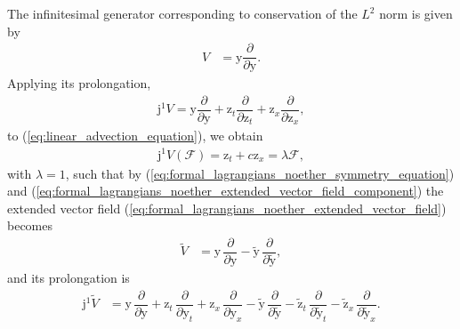 \documentclass[12pt,a4paper,reqno]{article}
\begin{document}
The infinitesimal generator corresponding to conservation of the $L^{2}$ norm is given by
\begin{align}\label{eq:linear_advection_generator_U_L2}
V &= {\ensuremath{{\ensuremath{\mathrm{{y}}}}}} \dfrac{\partial}{\partial {\ensuremath{{\ensuremath{\mathrm{{y}}}}}}} .
\end{align}
Applying its prolongation,
\begin{align}
{\ensuremath{\mathrm{j}}}^{1} V = {\ensuremath{{\ensuremath{\mathrm{{y}}}}}} \dfrac{\partial}{\partial {\ensuremath{{\ensuremath{\mathrm{{y}}}}}}} + {\ensuremath{{\ensuremath{\mathrm{{z}}}}}}_{\ensuremath{{\ensuremath{{t}}}}} \dfrac{\partial}{\partial {\ensuremath{{\ensuremath{\mathrm{{z}}}}}}_{\ensuremath{{\ensuremath{{t}}}}}} + {\ensuremath{{\ensuremath{\mathrm{{z}}}}}}_{\ensuremath{{\ensuremath{{x}}}}} \dfrac{\partial}{\partial {\ensuremath{{\ensuremath{\mathrm{{z}}}}}}_{\ensuremath{{\ensuremath{{x}}}}}} ,
\end{align}
to (\ref{eq:linear_advection_equation}), we obtain
\begin{align}
{\ensuremath{\mathrm{j}}}^{1} V (\mathcal{F}) = {\ensuremath{{\ensuremath{\mathrm{{z}}}}}}_{\ensuremath{{\ensuremath{{t}}}}} + c {\ensuremath{{\ensuremath{\mathrm{{z}}}}}}_{\ensuremath{{\ensuremath{{x}}}}} = \lambda \mathcal{F} ,
\end{align}
with $\lambda = 1$, such that by (\ref{eq:formal_lagrangians_noether_symmetry_equation}) and (\ref{eq:formal_lagrangians_noether_extended_vector_field_component}) the extended vector field (\ref{eq:formal_lagrangians_noether_extended_vector_field}) becomes
\begin{align}\label{eq:linear_advection_generator_L2}
\tilde{V} &= {\ensuremath{{\ensuremath{\mathrm{{y}}}}}} \, \dfrac{\partial}{\partial {\ensuremath{{\ensuremath{\mathrm{{y}}}}}}} - \tilde{\ensuremath{{\ensuremath{\mathrm{{y}}}}}} \, \dfrac{\partial}{\partial \tilde{\ensuremath{{\ensuremath{\mathrm{{y}}}}}}} ,
\end{align}
and its prolongation is
\begin{align}
{\ensuremath{\mathrm{j}}}^{1} \tilde{V}
&= {\ensuremath{{\ensuremath{\mathrm{{y}}}}}} \, \dfrac{\partial}{\partial {\ensuremath{{\ensuremath{\mathrm{{y}}}}}}}
 + {\ensuremath{{\ensuremath{\mathrm{{z}}}}}}_{\ensuremath{{\ensuremath{{t}}}}} \, \dfrac{\partial}{\partial {\ensuremath{{\ensuremath{\mathrm{{y}}}}}}_{\ensuremath{{\ensuremath{{t}}}}}}
 + {\ensuremath{{\ensuremath{\mathrm{{z}}}}}}_{\ensuremath{{\ensuremath{{x}}}}} \, \dfrac{\partial}{\partial {\ensuremath{{\ensuremath{\mathrm{{y}}}}}}_{\ensuremath{{\ensuremath{{x}}}}}}
 - \tilde{\ensuremath{{\ensuremath{\mathrm{{y}}}}}} \, \dfrac{\partial}{\partial \tilde{\ensuremath{{\ensuremath{\mathrm{{y}}}}}}}
 - \tilde{\ensuremath{{\ensuremath{\mathrm{{z}}}}}}_{\ensuremath{{\ensuremath{{t}}}}} \, \dfrac{\partial}{\partial \tilde{\ensuremath{{\ensuremath{\mathrm{{y}}}}}}_{\ensuremath{{\ensuremath{{t}}}}}}
 - \tilde{\ensuremath{{\ensuremath{\mathrm{{z}}}}}}_{\ensuremath{{\ensuremath{{x}}}}} \, \dfrac{\partial}{\partial \tilde{\ensuremath{{\ensuremath{\mathrm{{y}}}}}}_{\ensuremath{{\ensuremath{{x}}}}}} .
\end{align}
\end{document}
